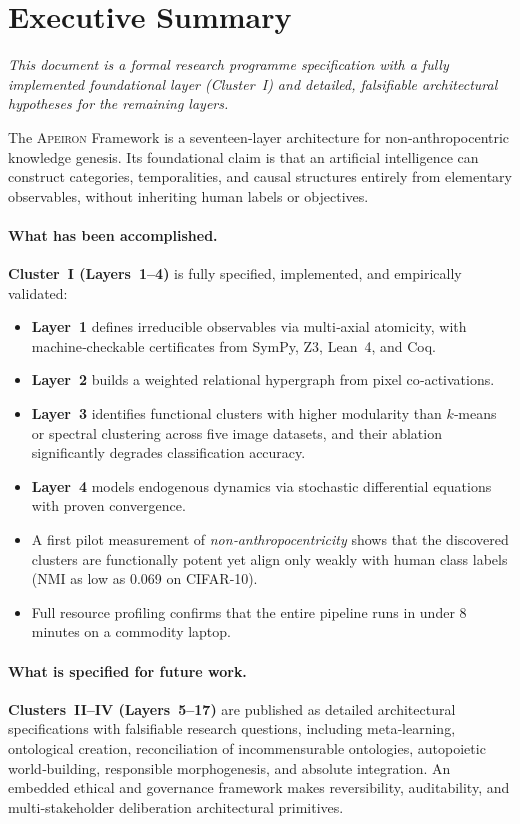 \section*{Executive Summary}

\textit{This document is a formal research programme specification with a
fully implemented foundational layer (Cluster~I) and detailed, falsifiable
architectural hypotheses for the remaining layers.}

The \textsc{Apeiron} Framework is a seventeen‑layer architecture for
non‑anthropocentric knowledge genesis.  Its foundational claim is that
an artificial intelligence can construct categories, temporalities,
and causal structures entirely from elementary observables, without
inheriting human labels or objectives.

\paragraph{What has been accomplished.}
\textbf{Cluster~I (Layers~1--4)} is fully specified, implemented, and
empirically validated:
\begin{itemize}
  \item \textbf{Layer~1} defines irreducible observables via
        multi‑axial atomicity, with machine‑checkable certificates
        from SymPy, Z3, Lean~4, and Coq.
  \item \textbf{Layer~2} builds a weighted relational hypergraph from
        pixel co‑activations.
  \item \textbf{Layer~3} identifies functional clusters with higher
        modularity than $k$‑means or spectral clustering across five
        image datasets, and their ablation significantly degrades
        classification accuracy.
  \item \textbf{Layer~4} models endogenous dynamics via stochastic
        differential equations with proven convergence.
  \item A first pilot measurement of \emph{non‑anthropocentricity}
        shows that the discovered clusters are functionally potent
        yet align only weakly with human class labels (NMI as low as
        0.069 on CIFAR‑10).
  \item Full resource profiling confirms that the entire pipeline
        runs in under 8\,minutes on a commodity laptop.
\end{itemize}

\paragraph{What is specified for future work.}
\textbf{Clusters~II--IV (Layers~5--17)} are published as detailed
architectural specifications with falsifiable research questions,
including meta‑learning, ontological creation, reconciliation of
incommensurable ontologies, autopoietic world‑building, responsible
morphogenesis, and absolute integration.  An embedded ethical and
governance framework makes reversibility, auditability, and
multi‑stakeholder deliberation architectural primitives.

